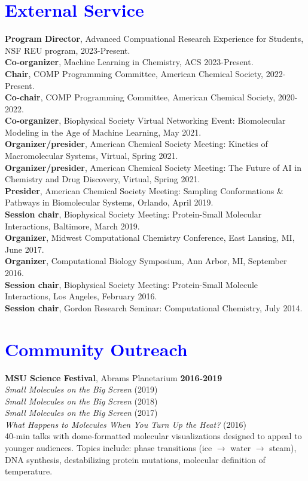 \documentclass[margin,line]{res}
\begin{document}
\begin{resume}
\section{\sc \textcolor{blue}{External Service}}
{\bf Program Director}, Advanced Compuational Research Experience for Students, NSF REU program, 2023-Present.\\
{\bf Co-organizer}, Machine Learning in Chemistry, ACS 2023-Present.\\ 
{\bf Chair}, COMP Programming Committee, American Chemical Society, 2022-Present.\\
{\bf Co-chair}, COMP Programming Committee, American Chemical Society, 2020-2022.\\
{\bf Co-organizer}, Biophysical Society Virtual Networking Event: Biomolecular Modeling in the Age of Machine Learning, May 2021.\\
{\bf Organizer/presider}, American Chemical Society Meeting: Kinetics of Macromolecular Systems, Virtual, Spring 2021.\\
{\bf Organizer/presider}, American Chemical Society Meeting: The Future of AI in Chemistry and Drug Discovery, Virtual, Spring 2021.\\
{\bf Presider}, American Chemical Society Meeting: Sampling Conformations \& Pathways in Biomolecular Systems, Orlando, April 2019.\\
{\bf Session chair}, Biophysical Society Meeting: Protein-Small Molecular Interactions, Baltimore, March 2019.\\
{\bf Organizer}, Midwest Computational Chemistry Conference, East Lansing, MI, June 2017. \\
{\bf Organizer}, Computational Biology Symposium, Ann Arbor, MI, September 2016. \\
{\bf Session chair}, Biophysical Society Meeting: Protein-Small Molecule Interactions, Los Angeles, February 2016. \\
{\bf Session chair}, Gordon Research Seminar: Computational Chemistry, July 2014. \\

\section{\sc \textcolor{blue}{Community Outreach}}
        {\bf MSU Science Festival}, Abrams Planetarium \hfill {\bf 2016-2019} \\
        \emph{Small Molecules on the Big Screen} (2019)\\
        \emph{Small Molecules on the Big Screen} (2018)\\
        \emph{Small Molecules on the Big Screen} (2017)\\
        \emph{What Happens to Molecules When You Turn Up the Heat?} (2016)\\
        40-min talks with dome-formatted molecular visualizations designed to appeal to younger audiences.  Topics include: phase transitions (ice $\rightarrow$ water $\rightarrow$ steam), DNA synthesis, destabilizing protein mutations, molecular definition of temperature.


\end{resume}
\end{document}
